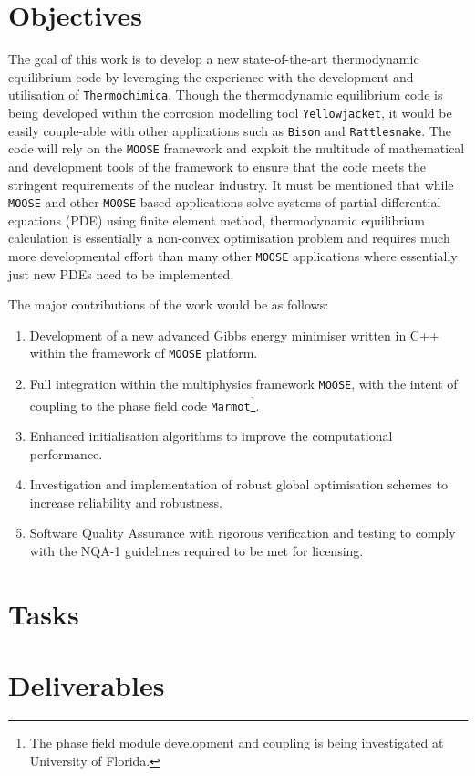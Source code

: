 	\section{Objectives}
	The goal of this work is to develop a new state-of-the-art thermodynamic equilibrium code by leveraging the experience with the development and utilisation of \texttt{Thermochimica}. Though the thermodynamic equilibrium code is being developed within the corrosion modelling tool \texttt{Yellowjacket}, it would be easily couple-able with other applications such as \texttt{Bison} and \texttt{Rattlesnake}. The code will rely on the \texttt{MOOSE} framework and exploit the multitude of mathematical and development tools of the framework to ensure that the code meets the stringent requirements of the nuclear industry. It must be mentioned that while \texttt{MOOSE} and other \texttt{MOOSE} based applications solve systems of partial differential equations (PDE) using finite element method, thermodynamic equilibrium calculation is essentially a non-convex optimisation problem and requires much more developmental effort than many other \texttt{MOOSE} applications where essentially just new PDEs need to be implemented.

	The major contributions of the work would be as follows:
	\begin{enumerate}
		\item Development of a new advanced Gibbs energy minimiser written in C++ within the framework of \texttt{MOOSE} platform.
		\item Full integration within the multiphysics framework \texttt{MOOSE}, with the intent of coupling to the phase field code \texttt{Marmot}\footnote{The phase field module development and coupling is being investigated at University of Florida.}.
		\item Enhanced initialisation algorithms to improve the computational performance.
		\item Investigation and implementation of robust global optimisation schemes to increase reliability and robustness.
		\item Software Quality Assurance  with rigorous verification and testing to comply with the NQA-1 guidelines required to be met for licensing.
	\end{enumerate}

	\section{Tasks}

	\section{Deliverables}
